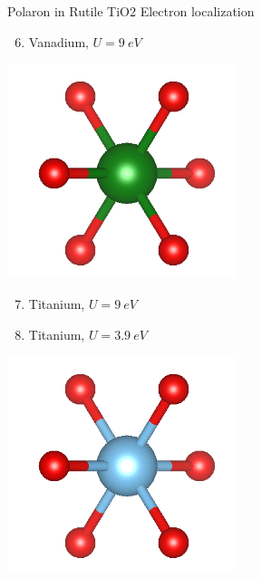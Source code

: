 \documentclass[11pt, xcolor=dvipsnames, aspectratio=43]{beamer}
\begin{document}
\begin{frame}{Polaron in Rutile TiO2}
    \alert{Electron localization} \\
    \begin{minipage}[]{0.49\linewidth}
        \begin{enumerate}
            \setcounter{enumi}{5}
            \item Vanadium, $U = \SI{9}{eV}$
        \end{enumerate}
    \end{minipage}
    \begin{minipage}{0.49\linewidth}
        \centering
        \includegraphics[width=0.5\textwidth]{figures/vanadium.png}
    \end{minipage}
    \pause
    \begin{minipage}[]{0.49\linewidth}
        \begin{enumerate}
            \setcounter{enumi}{6}
            \item Titanium, $U = \SI{9}{eV}$
            \item Titanium, $U = \SI{3.9}{eV}$
        \end{enumerate}
    \end{minipage}
    \begin{minipage}{0.49\linewidth}
        \centering
        \includegraphics[width=0.5\textwidth]{figures/titanium.png}
    \end{minipage}

\end{frame}
\end{document}
